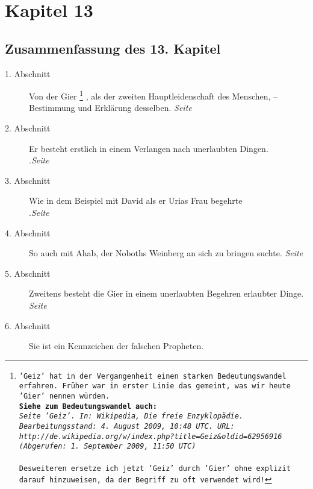 
\chapter{Kapitel 13} \label{kap13}

\section{Zusammenfassung des 13. Kapitel}

\begin{description}
\item[1. Abschnitt] Von der Gier
\footnote{\texttt{'Geiz' hat in der Vergangenheit einen starken
Bedeutungswandel erfahren. Früher war in erster Linie das gemeint, was wir
heute 'Gier' nennen würden.
\\ \textbf{Siehe zum Bedeutungswandel auch:}
\\ \textit{Seite 'Geiz'. In: Wikipedia, Die freie Enzyklopädie.
Bearbeitungsstand: 4. August 2009, 10:48 UTC. URL:
\\ http://de.wikipedia.org/w/index.php?title=Geiz\&oldid=62956916
\\ (Abgerufen: 1. September 2009, 11:50 UTC) }
\\ \\ Desweiteren ersetze ich jetzt 'Geiz' durch 'Gier' ohne explizit darauf
hinzuweisen, da der Begriff zu oft verwendet wird!}}
, als der zweiten Hauptleidenschaft des Menschen,
-- Bestimmung und Erklärung desselben.
\dotfill \textit{Seite~\pageref{kap13_ab1}}\\
\item[2. Abschnitt] Er besteht erstlich in einem Verlangen nach unerlaubten
Dingen.\\
.\dotfill \textit{Seite~\pageref{kap13_ab2}}\\
\item[3. Abschnitt] Wie in dem Beispiel mit David als er Urias Frau begehrte\\
.\dotfill \textit{Seite~\pageref{kap13_ab3}}\\
\item[4. Abschnitt] So auch mit Ahab, der Noboths Weinberg an sich zu bringen
suchte.
\dotfill \textit{Seite~\pageref{kap13_ab4}}\\
\item[5. Abschnitt] Zweitens besteht die Gier in einem unerlaubten Begehren
erlaubter Dinge.
\dotfill \textit{Seite~\pageref{kap13_ab5}}\\
\item[6. Abschnitt] Sie ist ein Kennzeichen der falschen Propheten.

\end{description}
